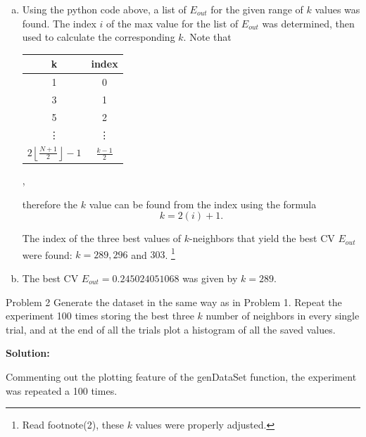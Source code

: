 \documentclass[a4paper]{article}
\begin{document}
\begin {description}
\begin{doublespace}
\begin{enumerate}[(a)]
This can be seen in the python document attached.
\item




Using the python code above, a list of $E_{out}$ for the given range of $k$ values was found. The index $i$ of the max value for the list of $E_{out}$ was determined, then used to calculate the corresponding $k$. Note that 

\begin{center}
\begin{tabular}{ c | c }
  k & index \\ \hline  
  1 & 0 \\
  3 & 1 \\
  5 & 2 \\
  \vdots & \vdots \\
  $2 \left \lfloor \frac{N+1}{2} \right \rfloor-1$& $\frac{k-1}{2}$ \\
\end{tabular},
\end{center}

therefore the $k$ value can be found from the index using the formula
\[k = 2(i) +1.\]

The index of the three best values of $k$-neighbors that yield the best CV $E_{out}$ were found: $k = 289, 296 $ and $303$. \footnote{Read footnote(2), these $k$ values were properly adjusted.}

\item The best CV $E_{out} = 0.245024051068$ was given by $k = 289$.
\end{enumerate}
\end{doublespace}

\item[Problem 2] Generate the dataset in the same way as in Problem 1. Repeat the experiment 100 times storing the best three $k$ number of neighbors in every single trial, and at the end of all the trials plot a histogram of all the saved values.

\smallskip

\textbf{Solution:}
\begin{doublespace}
Commenting out the plotting feature of the genDataSet function, the experiment was repeated a 100 times.


\newpage 


\end{doublespace}
\end{description}
\end{document}
